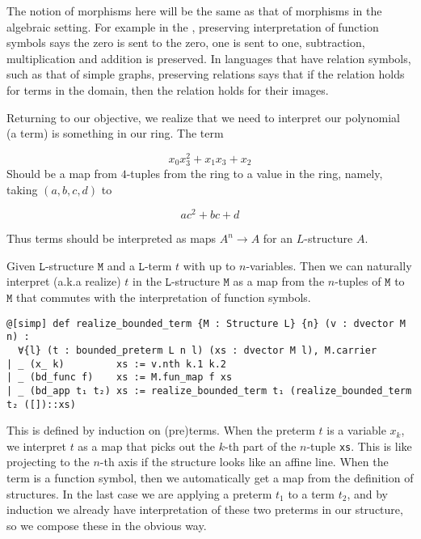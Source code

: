 \begin{dfn}
      The notion of morphisms here will be the same as that of
      morphisms in the algebraic setting.
      For example in the ,
      preserving interpretation of function symbols says
      the zero is sent to the zero, one is sent to one,
      subtraction, multiplication and addition is preserved.
      In languages that have relation symbols,
      such as that of simple graphs, preserving relations says that
      if the relation holds for terms in the domain,
      then the relation holds for their images.
\end{dfn}

Returning to our objective,
we realize that we need to interpret our polynomial (a term)
is something in our ring. The term

\[ x_{0} x_{3}^{2} + x_{1} x_{3} + x_{2} \]
Should be a map from $4$-tuples from the ring to a value in the ring,
namely, taking $(a, b, c, d)$ to

\[ a c^{2} + b c + d \]

Thus terms should be interpreted as maps $A^{n} \to A$ for an $L$-structure $A$.

\begin{dfn}
    Given $\texttt{L}$-structure $\texttt{M}$ and a $\texttt{L}$-term $t$ with up to $n$-variables.
    Then we can naturally interpret (a.k.a realize) $t$ in the $\texttt{L}$-structure $\texttt{M}$ as a
    map from the $n$-tuples of $\texttt{M}$ to $\texttt{M}$ that
    commutes with the interpretation of function symbols.

    \begin{lstlisting}
@[simp] def realize_bounded_term {M : Structure L} {n} (v : dvector M n) :
  ∀{l} (t : bounded_preterm L n l) (xs : dvector M l), M.carrier
| _ (x_ k)         xs := v.nth k.1 k.2
| _ (bd_func f)    xs := M.fun_map f xs
| _ (bd_app t₁ t₂) xs := realize_bounded_term t₁ (realize_bounded_term t₂ ([])::xs) \end{lstlisting}

    This is defined by induction on (pre)terms.
    When the preterm $t$ is a variable $x_{k}$, we interpret $t$ as a map
    that picks out the $k$-th part of the $n$-tuple \texttt{xs}.
    This is like projecting to the $n$-th axis if the structure looks like an affine line.
    When the term is a function symbol, then we automatically get a map from the
    definition of structures.
    In the last case we are applying a preterm $t_{1}$ to a term $t_{2}$,
    and by induction we already have interpretation of these two preterms
    in our structure, so we compose these in the obvious way.
\end{dfn}

